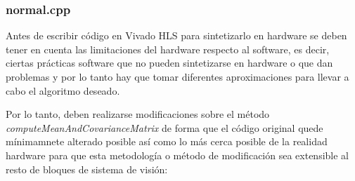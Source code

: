 \subsubsection{normal.cpp}
Antes de escribir código en Vivado HLS para sintetizarlo en hardware se deben tener en cuenta las limitaciones del hardware respecto al software, es decir, ciertas prácticas software que no pueden sintetizarse en hardware o que dan problemas y por lo tanto hay que tomar diferentes aproximaciones para llevar a cabo el algoritmo deseado. 

Por lo tanto, deben realizarse modificaciones sobre el método \textit{computeMeanAndCovarianceMatrix} de forma que el código original quede mínimamnete alterado posible así como lo más cerca posible de la realidad hardware para que esta metodología o método de modificación sea extensible al resto de bloques de sistema de visión:

